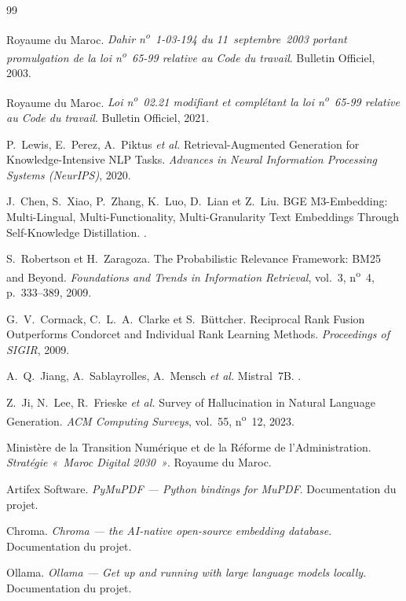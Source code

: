 \cleardoublepage
{}

\begin{thebibliography}{99}
\setlength{\itemsep}{6pt}

Royaume du Maroc.
\newblock \emph{Dahir n\textsuperscript{o}~1-03-194 du 11~septembre~2003 portant promulgation de
la loi n\textsuperscript{o}~65-99 relative au Code du travail}.
\newblock Bulletin Officiel, 2003.

Royaume du Maroc.
\newblock \emph{Loi n\textsuperscript{o}~02.21 modifiant et complétant la loi
n\textsuperscript{o}~65-99 relative au Code du travail}.
\newblock Bulletin Officiel, 2021.

P.~Lewis, E.~Perez, A.~Piktus \emph{et al.}
\newblock Retrieval-Augmented Generation for Knowledge-Intensive NLP Tasks.
\newblock \emph{Advances in Neural Information Processing Systems (NeurIPS)}, 2020.

J.~Chen, S.~Xiao, P.~Zhang, K.~Luo, D.~Lian et Z.~Liu.
\newblock BGE M3-Embedding: Multi-Lingual, Multi-Functionality, Multi-Granularity Text Embeddings
Through Self-Knowledge Distillation.
.

S.~Robertson et H.~Zaragoza.
\newblock The Probabilistic Relevance Framework: BM25 and Beyond.
\newblock \emph{Foundations and Trends in Information Retrieval}, vol.~3, n\textsuperscript{o}~4,
p.~333--389, 2009.

G.~V.~Cormack, C.~L.~A.~Clarke et S.~Büttcher.
\newblock Reciprocal Rank Fusion Outperforms Condorcet and Individual Rank Learning Methods.
\newblock \emph{Proceedings of SIGIR}, 2009.

A.~Q.~Jiang, A.~Sablayrolles, A.~Mensch \emph{et al.}
\newblock Mistral~7B.
.

Z.~Ji, N.~Lee, R.~Frieske \emph{et al.}
\newblock Survey of Hallucination in Natural Language Generation.
\newblock \emph{ACM Computing Surveys}, vol.~55, n\textsuperscript{o}~12, 2023.

Ministère de la Transition Numérique et de la Réforme de l'Administration.
\newblock \emph{Stratégie «~Maroc Digital 2030~»}.
\newblock Royaume du Maroc.

Artifex Software.
\newblock \emph{PyMuPDF --- Python bindings for MuPDF}.
\newblock Documentation du projet.

Chroma.
\newblock \emph{Chroma --- the AI-native open-source embedding database}.
\newblock Documentation du projet.

Ollama.
\newblock \emph{Ollama --- Get up and running with large language models locally}.
\newblock Documentation du projet.

\end{thebibliography}
